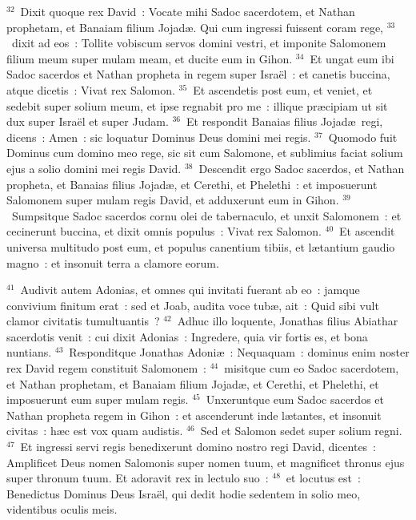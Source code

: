 ${}^{32}$~Dixit quoque rex David~: Vocate mihi Sadoc sacerdotem, et Nathan prophetam, et Banaiam filium Jojad\ae . Qui cum ingressi fuissent coram rege,
${}^{33}$~dixit ad eos~: Tollite vobiscum servos domini vestri, et imponite Salomonem filium meum super mulam meam, et ducite eum in Gihon.
${}^{34}$~Et ungat eum ibi Sadoc sacerdos et Nathan propheta in regem super Isra\"el~: et canetis buccina, atque dicetis~: Vivat rex Salomon.
${}^{35}$~Et ascendetis post eum, et veniet, et sedebit super solium meum, et ipse regnabit pro me~: illique pr\ae cipiam ut sit dux super Isra\"el et super Judam.
${}^{36}$~Et respondit Banaias filius Jojad\ae\ regi, dicens~: Amen~: sic loquatur Dominus Deus domini mei regis.
${}^{37}$~Quomodo fuit Dominus cum domino meo rege, sic sit cum Salomone, et sublimius faciat solium ejus a solio domini mei regis David.
${}^{38}$~Descendit ergo Sadoc sacerdos, et Nathan propheta, et Banaias filius Jojad\ae , et Cerethi, et Phelethi~: et imposuerunt Salomonem super mulam regis David, et adduxerunt eum in Gihon.
${}^{39}$~Sumpsitque Sadoc sacerdos cornu olei de tabernaculo, et unxit Salomonem~: et cecinerunt buccina, et dixit omnis populus~: Vivat rex Salomon.
${}^{40}$~Et ascendit universa multitudo post eum, et populus canentium tibiis, et l\ae tantium gaudio magno~: et insonuit terra a clamore eorum.


${}^{41}$~Audivit autem Adonias, et omnes qui invitati fuerant ab eo~: jamque convivium finitum erat~: sed et Joab, audita voce tub\ae , ait~: Quid sibi vult clamor civitatis tumultuantis~?
${}^{42}$~Adhuc illo loquente, Jonathas filius Abiathar sacerdotis venit~: cui dixit Adonias~: Ingredere, quia vir fortis es, et bona nuntians.
${}^{43}$~Responditque Jonathas Adoni\ae~: Nequaquam~: dominus enim noster rex David regem constituit Salomonem~:
${}^{44}$~misitque cum eo Sadoc sacerdotem, et Nathan prophetam, et Banaiam filium Jojad\ae , et Cerethi, et Phelethi, et imposuerunt eum super mulam regis.
${}^{45}$~Unxeruntque eum Sadoc sacerdos et Nathan propheta regem in Gihon~: et ascenderunt inde l\ae tantes, et insonuit civitas~: h\ae c est vox quam audistis.
${}^{46}$~Sed et Salomon sedet super solium regni.
${}^{47}$~Et ingressi servi regis benedixerunt domino nostro regi David, dicentes~: Amplificet Deus nomen Salomonis super nomen tuum, et magnificet thronus ejus super thronum tuum. Et adoravit rex in lectulo suo~:
${}^{48}$~et locutus est~: Benedictus Dominus Deus Isra\"el, qui dedit hodie sedentem in solio meo, videntibus oculis meis.


